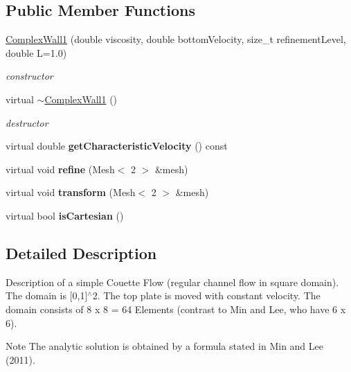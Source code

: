 \subsection*{Public Member Functions}
\begin{DoxyCompactItemize}
\item 
\hyperlink{classnatrium_1_1ComplexWall1_ad619c81f979a47c447fc0061bed20e05}{ComplexWall1} (double viscosity, double bottomVelocity, size\_\-t refinementLevel, double L=1.0)
\begin{DoxyCompactList}\small\item\em constructor \item\end{DoxyCompactList}\item 
\hypertarget{classnatrium_1_1ComplexWall1_a6d68cdec98529c139716ae98e8149d30}{
virtual \hyperlink{classnatrium_1_1ComplexWall1_a6d68cdec98529c139716ae98e8149d30}{$\sim$ComplexWall1} ()}
\label{classnatrium_1_1ComplexWall1_a6d68cdec98529c139716ae98e8149d30}

\begin{DoxyCompactList}\small\item\em destructor \item\end{DoxyCompactList}\item 
\hypertarget{classnatrium_1_1ComplexWall1_a782e4262d5c717656803f43eb4e05202}{
virtual double {\bfseries getCharacteristicVelocity} () const }
\label{classnatrium_1_1ComplexWall1_a782e4262d5c717656803f43eb4e05202}

\item 
\hypertarget{classnatrium_1_1ComplexWall1_a605109508f3967cfa827ca9e18e308b2}{
virtual void {\bfseries refine} (Mesh$<$ 2 $>$ \&mesh)}
\label{classnatrium_1_1ComplexWall1_a605109508f3967cfa827ca9e18e308b2}

\item 
\hypertarget{classnatrium_1_1ComplexWall1_a3bdc79475f84f14e49ff1dcc93f16648}{
virtual void {\bfseries transform} (Mesh$<$ 2 $>$ \&mesh)}
\label{classnatrium_1_1ComplexWall1_a3bdc79475f84f14e49ff1dcc93f16648}

\item 
\hypertarget{classnatrium_1_1ComplexWall1_acbe05af12b901e809ed435267b851ef7}{
virtual bool {\bfseries isCartesian} ()}
\label{classnatrium_1_1ComplexWall1_acbe05af12b901e809ed435267b851ef7}

\end{DoxyCompactItemize}


\subsection{Detailed Description}
Description of a simple Couette Flow (regular channel flow in square domain). The domain is \mbox{[}0,1\mbox{]}$^\wedge$2. The top plate is moved with constant velocity. The domain consists of 8 x 8 = 64 Elements (contrast to Min and Lee, who have 6 x 6). \begin{DoxyNote}{Note}
The analytic solution is obtained by a formula stated in Min and Lee (2011). 
\end{DoxyNote}



